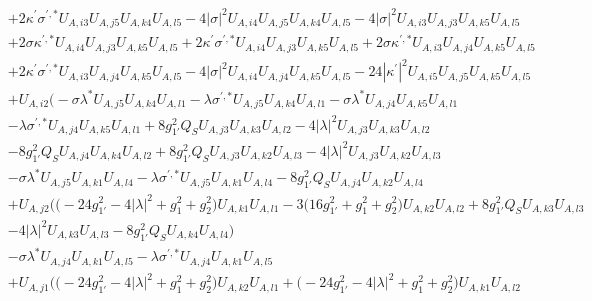 \begin{align}
 &+2 \kappa^\prime \sigma^{\prime,*} U_{A,{i 3}} U_{A,{j 5}} U_{A,{k 4}} U_{A,{l 5}} -4 |\sigma|^2 U_{A,{i 4}} U_{A,{j 5}} U_{A,{k 4}} U_{A,{l 5}} -4 |\sigma|^2 U_{A,{i 3}} U_{A,{j 3}} U_{A,{k 5}} U_{A,{l 5}} \nonumber \\ 
 &+2 \sigma \kappa^{\prime,*} U_{A,{i 4}} U_{A,{j 3}} U_{A,{k 5}} U_{A,{l 5}} +2 \kappa^\prime \sigma^{\prime,*} U_{A,{i 4}} U_{A,{j 3}} U_{A,{k 5}} U_{A,{l 5}} +2 \sigma \kappa^{\prime,*} U_{A,{i 3}} U_{A,{j 4}} U_{A,{k 5}} U_{A,{l 5}} \nonumber \\ 
 &+2 \kappa^\prime \sigma^{\prime,*} U_{A,{i 3}} U_{A,{j 4}} U_{A,{k 5}} U_{A,{l 5}} -4 |\sigma|^2 U_{A,{i 4}} U_{A,{j 4}} U_{A,{k 5}} U_{A,{l 5}} -24 |\kappa^\prime|^2 U_{A,{i 5}} U_{A,{j 5}} U_{A,{k 5}} U_{A,{l 5}} \nonumber \\ 
 &+U_{A,{i 2}} \Big(- \sigma \lambda^* U_{A,{j 5}} U_{A,{k 4}} U_{A,{l 1}} - \lambda \sigma^{\prime,*} U_{A,{j 5}} U_{A,{k 4}} U_{A,{l 1}} - \sigma \lambda^* U_{A,{j 4}} U_{A,{k 5}} U_{A,{l 1}} \nonumber \\ 
 &- \lambda \sigma^{\prime,*} U_{A,{j 4}} U_{A,{k 5}} U_{A,{l 1}} +8 g_{1'}^{2} Q_{S} U_{A,{j 3}} U_{A,{k 3}} U_{A,{l 2}} -4 |\lambda|^2 U_{A,{j 3}} U_{A,{k 3}} U_{A,{l 2}} \nonumber \\ 
 &-8 g_{1'}^{2} Q_{S} U_{A,{j 4}} U_{A,{k 4}} U_{A,{l 2}} +8 g_{1'}^{2} Q_{S} U_{A,{j 3}} U_{A,{k 2}} U_{A,{l 3}} -4 |\lambda|^2 U_{A,{j 3}} U_{A,{k 2}} U_{A,{l 3}} \nonumber \\ 
 &- \sigma \lambda^* U_{A,{j 5}} U_{A,{k 1}} U_{A,{l 4}} - \lambda \sigma^{\prime,*} U_{A,{j 5}} U_{A,{k 1}} U_{A,{l 4}} -8 g_{1'}^{2} Q_{S} U_{A,{j 4}} U_{A,{k 2}} U_{A,{l 4}} \nonumber \\ 
 &+U_{A,{j 2}} \Big(\Big(-24 g_{1'}^{2}  -4 |\lambda|^2  + g_{1}^{2} + g_{2}^{2}\Big)U_{A,{k 1}} U_{A,{l 1}} -3 \Big(16 g_{1'}^{2}  + g_{1}^{2} + g_{2}^{2}\Big)U_{A,{k 2}} U_{A,{l 2}} +8 g_{1'}^{2} Q_{S} U_{A,{k 3}} U_{A,{l 3}} \nonumber \\ 
 &-4 |\lambda|^2 U_{A,{k 3}} U_{A,{l 3}} -8 g_{1'}^{2} Q_{S} U_{A,{k 4}} U_{A,{l 4}} \Big)\nonumber \\ 
 &- \sigma \lambda^* U_{A,{j 4}} U_{A,{k 1}} U_{A,{l 5}} - \lambda \sigma^{\prime,*} U_{A,{j 4}} U_{A,{k 1}} U_{A,{l 5}} \nonumber \\ 
 &+U_{A,{j 1}} \Big(\Big(-24 g_{1'}^{2}  -4 |\lambda|^2  + g_{1}^{2} + g_{2}^{2}\Big)U_{A,{k 2}} U_{A,{l 1}} +\Big(-24 g_{1'}^{2}  -4 |\lambda|^2  + g_{1}^{2} + g_{2}^{2}\Big)U_{A,{k 1}} U_{A,{l 2}} \nonumber \\ 

\end{align}
